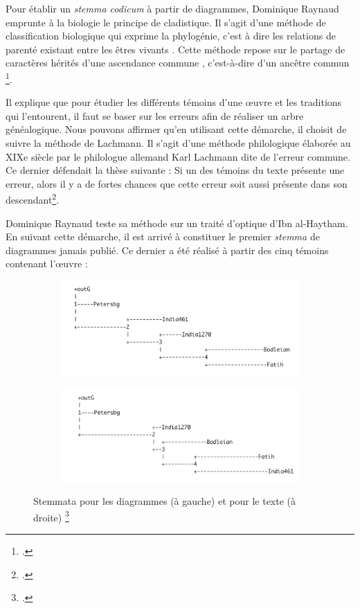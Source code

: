 Pour établir un \textit{stemma codicum} à partir de diagrammes, Dominique Raynaud emprunte à la biologie le principe de cladistique. Il s'agit \og d'une méthode de classification biologique qui exprime la phylogénie, c'est à dire les relations de parenté existant entre les êtres vivants \fg. Cette méthode \og repose sur le partage de caractères hérités d'une ascendance commune \fg, c'est-à-dire d'un \og ancêtre commun \fg \footcite{tassyCLADISTIQUE2012}.

Il explique que pour étudier les différents témoins d'une œuvre et les traditions qui l'entourent, il faut se baser sur les erreurs afin de réaliser un arbre généalogique. Nous pouvons affirmer qu'en utilisant cette démarche, il choisit de suivre la méthode de Lachmann. Il s'agit d'une méthode philologique élaborée au XIXe siècle par le philologue allemand Karl Lachmann dite de l'erreur commune. Ce dernier défendait la thèse suivante : Si un des témoins du texte présente une erreur, alors il y a de fortes chances que cette erreur soit aussi présente dans son descendant\footcite{pouliquenUsingLatticesReconstructing}.

Dominique Raynaud teste sa méthode sur un traité d'optique d'Ibn al-Haytham. En suivant cette démarche, il est arrivé à constituer le premier \textit{stemma} de diagrammes jamais publié. Ce dernier a été réalisé à partir des cinq témoins contenant l'œuvre : 


\begin{figure}[h]
	\centering
	\begin{subfigure}{0.48\linewidth}
		\centering
		\includegraphics[width=\linewidth]{images/diagram_stemma.png}
	\end{subfigure}
	\hfill
	\begin{subfigure}{0.48\linewidth}
		\centering
		\includegraphics[width=\linewidth]{images/text_stemma.png}
	\end{subfigure}
	\caption{Stemmata pour les diagrammes (à gauche) et pour le texte (à droite) \footcite{raynaudBuildingStemmaCodicum2014}}
	\label{fig:stemma}
\end{figure}


